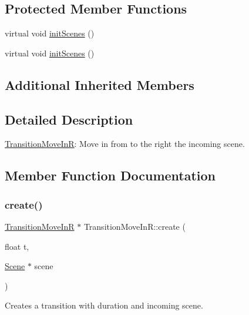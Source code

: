 \subsection*{Protected Member Functions}
\begin{DoxyCompactItemize}
\item 
virtual void \hyperlink{classTransitionMoveInR_ab9629d0b43632bd10024dbe79b15d411}{init\+Scenes} ()
\item 
virtual void \hyperlink{classTransitionMoveInR_abea3ee2e03e712a74ffeb1be776b2ca8}{init\+Scenes} ()
\end{DoxyCompactItemize}
\subsection*{Additional Inherited Members}


\subsection{Detailed Description}
\hyperlink{classTransitionMoveInR}{Transition\+Move\+InR}\+: Move in from to the right the incoming scene. 

\subsection{Member Function Documentation}
\mbox{\label{classTransitionMoveInR_a37e498709830d50089d710dd6f182a30}} 
\subsubsection{\texorpdfstring{create()}{create()}\hspace{0.1cm}{\footnotesize\ttfamily [1/2]}}
{\footnotesize\ttfamily \hyperlink{classTransitionMoveInR}{Transition\+Move\+InR} $\ast$ Transition\+Move\+In\+R\+::create (\begin{DoxyParamCaption}\item[{float}]{t,  }\item[{\hyperlink{classScene}{Scene} $\ast$}]{scene }\end{DoxyParamCaption})\hspace{0.3cm}{\ttfamily [static]}}

Creates a transition with duration and incoming scene.


